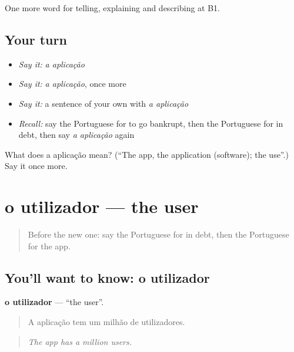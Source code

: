 \begin{grammarlens}[title={What you've built}]
One more word for telling, explaining and describing at B1.
\end{grammarlens}

\subsection*{Your turn}
\begin{itemize}
\raggedright
  \item \emph{Say it:} \emph{a aplicação}
  \item \emph{Say it:} \emph{a aplicação}, once more
  \item \emph{Say it:} a sentence of your own with \emph{a aplicação}
  \item \emph{Recall:} say the Portuguese for to go bankrupt, then the Portuguese for in debt, then say \emph{a aplicação} again
\end{itemize}

\begin{tcolorbox}[breakable,colback=teal!4,colframe=teal!35!black,title={Before you move on}]
What does a aplicação mean? (\textquotedblleft{}The app, the application (software); the use\textquotedblright{}.) Say it once more.
\end{tcolorbox}
\section[o utilizador]{o utilizador — the user}

\label{lesson:PT-C396-utilizador}



\begin{quote}
Before the new one: say the Portuguese for in debt, then the Portuguese for the app.
\end{quote}

\subsection*{You'll want to know: o utilizador}
\textbf{o utilizador} — \textquotedblleft{}the user\textquotedblright{}.

\begin{quote}
A aplicação tem um milhão de utilizadores.
\end{quote}

\begin{quote}
\emph{The app has a million users.}
\end{quote}

